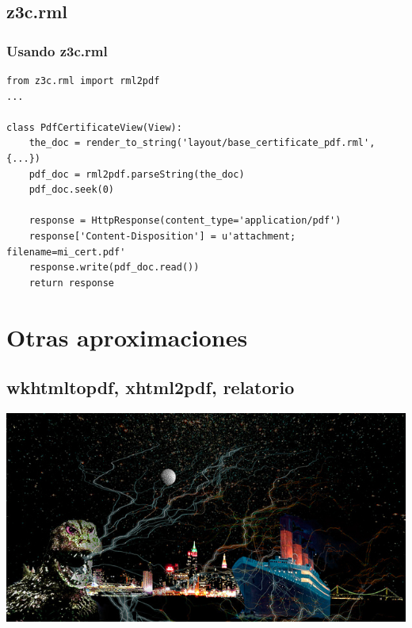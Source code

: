 \documentclass[8pt,xcolor={usenames,dvipsnames}]{beamer}
\begin{document}
\subsection{z3c.rml}

\begin{frame}[fragile]
\frametitle{Usando z3c.rml}
\begin{verbatim}
from z3c.rml import rml2pdf
...

class PdfCertificateView(View):
    the_doc = render_to_string('layout/base_certificate_pdf.rml', {...})
    pdf_doc = rml2pdf.parseString(the_doc)
    pdf_doc.seek(0)

    response = HttpResponse(content_type='application/pdf')
    response['Content-Disposition'] = u'attachment; filename=mi_cert.pdf'
    response.write(pdf_doc.read())
    return response

\end{verbatim}
\end{frame}

\section{Otras aproximaciones}
\subsection{wkhtmltopdf, xhtml2pdf, relatorio}

\begin{frame}
\includegraphics[width=\paperwidth]{images/loo.jpg}
\end{frame}
\end{document}
